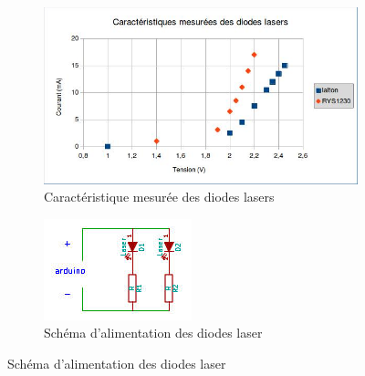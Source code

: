 \documentclass[a4paper,10pt]{report}
\begin{document}
\begin{figure}[h!]
  \centering
  \begin{subfigure}[b]{0.6\textwidth}
    \includegraphics[width=\textwidth]{Caracteristique.jpg}
    \caption{Caractéristique mesurée des diodes lasers}
    \label{laser_caracteristique}
  \end{subfigure}
  \begin{subfigure}[b]{0.3\textwidth}
    \includegraphics[width=\textwidth]{circuit2lasers.jpg}
    \caption{Schéma d'alimentation des diodes laser}
    \label{laser_circuit}
  \end{subfigure}
\end{figure}

\newpage
\end{document}
